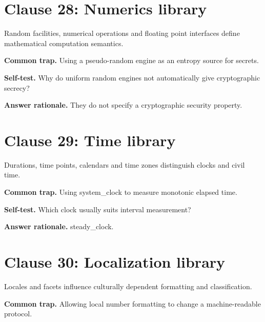 \documentclass[11pt]{article}
\begin{document}
\section{Clause 28: Numerics library}
Random facilities, numerical operations and floating point interfaces define mathematical computation semantics.

\textbf{Common trap.} Using a pseudo-random engine as an entropy source for secrets.

\textbf{Self-test.} Why do uniform random engines not automatically give cryptographic secrecy?

\textbf{Answer rationale.} They do not specify a cryptographic security property.

\section{Clause 29: Time library}
Durations, time points, calendars and time zones distinguish clocks and civil time.

\textbf{Common trap.} Using system\_clock to measure monotonic elapsed time.

\textbf{Self-test.} Which clock usually suits interval measurement?

\textbf{Answer rationale.} steady\_clock.

\section{Clause 30: Localization library}
Locales and facets influence culturally dependent formatting and classification.

\textbf{Common trap.} Allowing local number formatting to change a machine-readable protocol.
\end{document}
